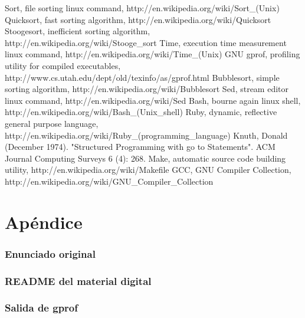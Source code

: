 \documentclass[a4paper,11pt]{article}
\begin{document}
\begin{thebibliography}{99}

 Sort, file sorting linux command, http://en.wikipedia.org/wiki/Sort\_(Unix)
 Quicksort, fast sorting algorithm, http://en.wikipedia.org/wiki/Quicksort
 Stoogesort, inefficient sorting algorithm, http://en.wikipedia.org/wiki/Stooge\_sort
 Time, execution time measurement linux command, http://en.wikipedia.org/wiki/Time\_(Unix)
 GNU gprof, profiling utility for compiled executables, http://www.cs.utah.edu/dept/old/texinfo/as/gprof.html
 Bubblesort, simple sorting algorithm, http://en.wikipedia.org/wiki/Bubblesort
 Sed, stream editor linux command, http://en.wikipedia.org/wiki/Sed
 Bash, bourne again linux shell, http://en.wikipedia.org/wiki/Bash\_(Unix\_shell)
 Ruby, dynamic, reflective general purpose language, http://en.wikipedia.org/wiki/Ruby\_(programming\_language)
 Knuth, Donald (December 1974). "Structured Programming with go to Statements". ACM Journal Computing Surveys 6 (4): 268.
 Make, automatic source code building utility, http://en.wikipedia.org/wiki/Makefile
 GCC, GNU Compiler Collection, http://en.wikipedia.org/wiki/GNU\_Compiler\_Collection

\end{thebibliography}

\clearpage

\part{Apéndice}
\appendix

\section{Enunciado original}\label{sec:enunciado}


\clearpage
\section{README del material digital}\label{sec:readme}


\clearpage
\section{Salida de gprof}\label{sec:gprof}
\clearpage
\lstset{
  basicstyle=\footnotesize,
  showspaces=false,
  showstringspaces=false,
  breaklines=true,
  frame=single
}
\end{document}
